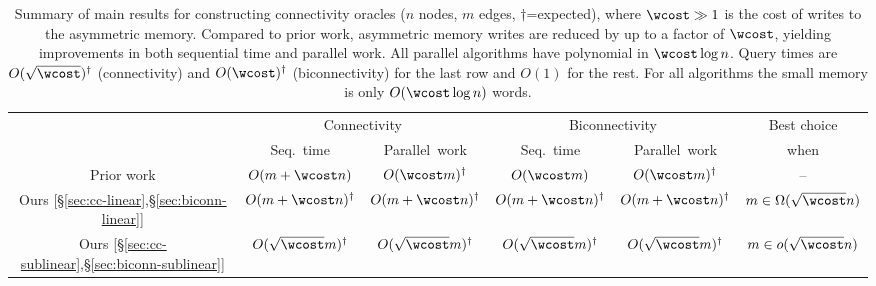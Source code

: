\begin{table*}[t]
\begin{center}
\begin{tabular}{c|c@{  }@{  }c|c@{  }@{  }c|c}\toprule
& \multicolumn{2}{c|}{Connectivity} & \multicolumn{2}{c|}{Biconnectivity}
  & Best choice \\
& Seq.~time & Parallel~work & Seq.~time & Parallel~work
  & when \\ \hline
Prior work
  & $O(m+\wcost n)$ & $O(\wcost m)^{\dag}$
  & $O(\wcost m)$ & $O(\wcost m)^{\dag}$
  & -- \\
Ours [\S\ref{sec:cc-linear},\S\ref{sec:biconn-linear}]
  & $O(m + \wcost n)^{\dag}$ & $O(m + \wcost n)^{\dag}$
  & $O(m + \wcost n)^{\dag}$ & $O(m + \wcost n)^{\dag}$
  & $m \in \Omega(\sqrt{\wcost} n)$ \\
Ours [\S\ref{sec:cc-sublinear},\S\ref{sec:biconn-sublinear}]
  & $O(\sqrt{\wcost} m)^{\dag}$ & $O(\sqrt{\wcost} m)^{\dag}$
  & $O(\sqrt{\wcost} m)^{\dag}$ & $O(\sqrt{\wcost} m)^{\dag}$
  & $m \in o(\sqrt{\wcost} n)$ \\ \bottomrule
\end{tabular}
\caption{\label{tbl:results} Summary of main results for constructing
  connectivity oracles ($n$ nodes, $m$ edges, $\dag$=expected), where
  $\wcost \gg 1$ is the cost of writes to the asymmetric memory.
  Compared to prior work, asymmetric memory writes are reduced by up
  to a factor of $\wcost$, yielding improvements in both sequential
  time and parallel work.  All parallel algorithms have \depth{}
  polynomial in $\wcost \log n$.  Query times are
  $O(\sqrt{\wcost})^{\dag}$ (connectivity) and $O(\wcost)^{\dag}$
  (biconnectivity) for the last row and $O(1)$ for the rest.
  For all
  algorithms the small \local{} memory is only $O(\wcost \log n)$ words.}
\vspace{-0.1in}
\end{center}
\end{table*}
